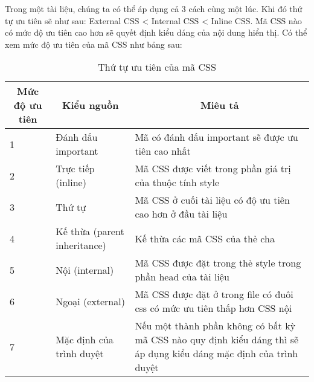Trong một tài liệu, chúng ta có thể áp dụng cả 3 cách cùng một lúc. Khi đó thứ tự ưu tiên sẽ như sau: External CSS < Internal CSS < Inline CSS. Mã CSS nào có mức độ ưu tiên cao hơn sẽ quyết định kiểu dáng của nội dung hiển thị. Có thể xem mức độ ưu tiên của mã CSS như bảng  sau:
\begin{center}

 \begin{longtable}{|m{2cm}|m{2cm}| m{7cm}|}
 \caption[Thứ tự ưu tiên của mã CSS]{Thứ tự ưu tiên của mã CSS}
  \endfirsthead
  \endhead
 
 \hline
 
 \multicolumn{1}{|c|}{ \textbf{ Mức độ ưu tiên}}	
 & \multicolumn{1}{c|}{ \textbf{Kiểu nguồn}}  &	\multicolumn{1}{c|}{
 \textbf{Miêu tả }}
 \\ 
\hline

1 &	Đánh dấu important	& Mã có đánh dấu \!important sẽ được ưu tiên cao nhất \\ \hline
2	& Trực tiếp (inline)& 	Mã CSS được viết trong phần giá trị của thuộc tính style \\ \hline
3 &	Thứ tự 	& Mã CSS ở cuối tài liệu có độ ưu tiên cao hơn ở đầu tài liệu \\ \hline
4 &	Kế thừa (parent inheritance)&	Kế thừa các mã CSS của thẻ cha \\ \hline
5 &	Nội (internal)&	Mã CSS được đặt trong thẻ {\ttfamily style} trong phần {\ttfamily head} của tài liệu \\ \hline
6	& Ngoại (external) &	Mã CSS được đặt ở trong file có đuôi css có mức ưu tiên thấp hơn CSS nội \\ \hline
7 & 	Mặc định của trình duyệt &	Nếu một thành phần không có bất kỳ mã CSS nào quy định kiểu dáng thì sẽ áp dụng kiểu dáng mặc định của trình duyệt  \\ \hline

\end{longtable}

\end{center}
\vspace{-1cm}

